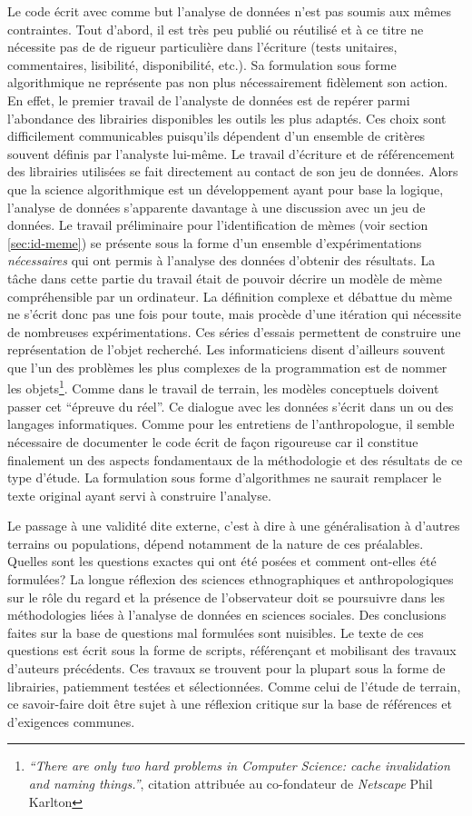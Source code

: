 Le code écrit avec comme but l'analyse de données n'est pas soumis aux mêmes contraintes. Tout d'abord, il est très peu publié ou réutilisé et à ce titre ne nécessite pas de de rigueur particulière dans l'écriture (tests unitaires, commentaires, lisibilité, disponibilité, etc.). Sa formulation sous forme algorithmique ne représente pas non plus nécessairement fidèlement son action. En effet, le premier travail de l'analyste de données est de repérer parmi l'abondance des librairies disponibles les outils les plus adaptés. Ces choix sont difficilement communicables puisqu'ils dépendent d'un ensemble de critères souvent définis par l'analyste lui-même. Le travail d'écriture et de référencement des librairies utilisées se fait directement au contact de son jeu de données. Alors que la science algorithmique est un développement ayant pour base la logique, l'analyse de données s'apparente davantage à une discussion avec un jeu de données. Le travail préliminaire pour l'identification de mèmes (voir section \ref{sec:id-meme}) se présente sous la forme d'un ensemble d'expérimentations \textit{nécessaires} qui ont permis à l'analyse des données d'obtenir des résultats. La tâche dans cette partie du travail était de pouvoir décrire un modèle de mème compréhensible par un ordinateur. La définition complexe et débattue du mème ne s'écrit donc pas une fois pour toute, mais procède d'une itération qui nécessite de nombreuses expérimentations. Ces séries d'essais permettent de construire une représentation de l'objet recherché. Les informaticiens disent d'ailleurs souvent que l'un des problèmes les plus complexes de la programmation est de nommer les objets\footnote{\textit{``There are only two hard problems in Computer Science: cache invalidation and naming things.''}, citation attribuée au co-fondateur de \textit{Netscape} Phil Karlton}. Comme dans le travail de terrain, les modèles conceptuels doivent passer cet ``épreuve du réel''. Ce dialogue avec les données s'écrit dans un ou des langages informatiques. Comme pour les entretiens de l'anthropologue, il semble nécessaire de documenter le code écrit de façon rigoureuse car il constitue finalement un des aspects fondamentaux de la méthodologie et des résultats de ce type d'étude. La formulation sous forme d'algorithmes ne saurait remplacer le texte original ayant servi à construire l'analyse.

Le passage à une validité dite externe, c'est à dire à une généralisation à d'autres terrains ou populations, dépend notamment de la nature de ces préalables. Quelles sont les questions exactes qui ont été posées et comment ont-elles été formulées? La longue réflexion des sciences ethnographiques et anthropologiques sur le rôle du regard et la présence de l'observateur doit se poursuivre dans les méthodologies liées à l'analyse de données en sciences sociales. Des conclusions faites sur la base de questions mal formulées sont nuisibles. Le texte de ces questions est écrit sous la forme de scripts, référençant et mobilisant des travaux d'auteurs précédents. Ces travaux se trouvent  pour la plupart sous la forme de librairies, patiemment testées et sélectionnées. Comme celui de l'étude de terrain, ce savoir-faire doit être sujet à une réflexion critique sur la base de références et d'exigences communes.

